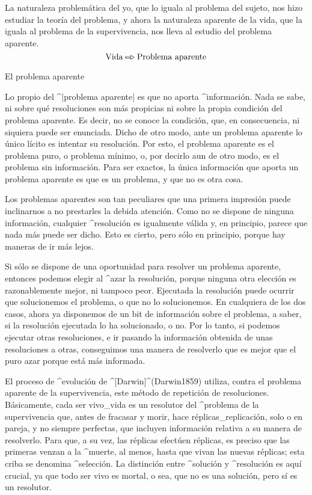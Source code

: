 La naturaleza problemática del yo, que lo iguala al problema del sujeto,
nos hizo estudiar la teoría del problema, y ahora la naturaleza aparente
de la vida, que la iguala al problema de la supervivencia, nos lleva al
estudio del problema aparente.
$$\hbox{Vida} \etapa \hbox{Problema aparente}$$

\kern-12pt

\Section El problema aparente

Lo propio del ^|problema aparente| es que no aporta ^{información}. Nada
se sabe, ni sobre qué resoluciones son más propicias ni sobre la propia
condición del problema aparente. Es decir, no se conoce la condición,
que, en consecuencia, ni siquiera puede ser enunciada. Dicho de otro
modo, ante un problema aparente lo único lícito es intentar su
resolución. Por esto, el problema aparente es el problema puro, o
problema mínimo, o, por decirlo aun de otro modo, es el problema sin
información. Para ser exactos, la única información que aporta un
problema aparente es que es un problema, y que no es otra cosa.

Los problemas aparentes son tan peculiares que una primera impresión
puede inclinarnos a no prestarles la debida atención. Como no se dispone
de ninguna información, cualquier ^{resolución} es igualmente válida y,
en principio, parece que nada más puede ser dicho. Esto es cierto, pero
sólo en principio, porque hay maneras de ir más lejos.

Si sólo se dispone de una oportunidad para resolver un problema
aparente, entonces podemos elegir al ^{azar} la resolución, porque
ninguna otra elección es razonablemente mejor, ni tampoco peor.
Ejecutada la resolución puede ocurrir que solucionemos el problema, o
que no lo solucionemos. En cualquiera de los dos casos, ahora ya
disponemos de un bit de información sobre el problema, a saber, si la
resolución ejecutada lo ha solucionado, o no. Por lo tanto, si podemos
ejecutar otras resoluciones, e ir pasando la información obtenida de
unas resoluciones a otras, conseguimos una manera de resolverlo que es
mejor que el puro azar porque está más informada.

El proceso de ^{evolución} de ^[Darwin]^(Darwin1859) utiliza, contra el
problema aparente de la supervivencia, este método de repetición de
resoluciones. Básicamente, cada ser vivo_{vida} es un resolutor del
^{problema de la supervivencia} que, antes de fracasar y morir, hace
réplicas_{replicación}, solo o en pareja, y no siempre perfectas, que
incluyen información relativa a su manera de resolverlo. Para que, a su
vez, las réplicas efectúen réplicas, es preciso que las primeras venzan
a la ^{muerte}, al menos, hasta que vivan las nuevas réplicas; esta
criba se denomina ^{selección}. La distinción entre ^{solución} y
^{resolución} es aquí crucial, ya que todo ser vivo es mortal, o sea,
que no es una solución, pero sí es un resolutor.

